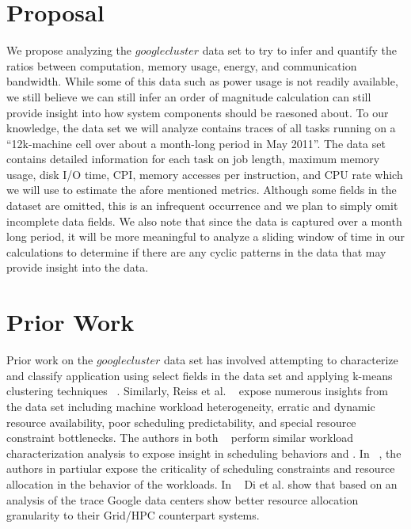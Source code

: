 \documentclass{article}
\begin{document}
\section{Proposal}

We propose analyzing the $googlecluster$ data set to try to infer and quantify the ratios between computation, memory usage, energy, and communication bandwidth. 
While some of this data such as power usage is not readily available, we still believe we can still infer an order of magnitude calculation can still provide insight into how system components should be raesoned about.
To our knowledge, the data set we will analyze contains traces of all tasks running on a ``12k-machine cell over about a month-long period in May 2011''.
The data set contains detailed information for each task on job length, maximum memory usage, disk I/O time, CPI, memory accesses per instruction, and CPU rate which we will use to estimate the afore mentioned metrics.
Although some fields in the dataset are omitted, this is an infrequent occurrence and we plan to simply omit incomplete data fields.
We also note that since the data is captured over a month long period, it will be more meaningful to analyze a sliding window of time in our calculations to determine if there are any cyclic patterns in the data that may provide insight into the data.

\section{Prior Work}

Prior work on the $googlecluster$ data set has involved attempting to characterize and classify application using select fields in the data set and applying k-means clustering techniques ~\cite{clusterdata:Di2013, clusterdata:Mishra2010}.
Similarly, Reiss et al. ~\cite{clusterdata:Reiss2012b} expose numerous insights from the data set including machine workload heterogeneity, erratic and dynamic resource availability, poor scheduling predictability, and special resource constraint bottlenecks.
The authors in both ~\cite{clusterdata:Liu2012, clusterdata:Mishra2010} perform similar workload characterization analysis to expose insight in scheduling behaviors and .
In ~\cite{clusterdata:Lui2012}, the authors in partiular expose the criticality of scheduling constraints and resource allocation in the behavior of the workloads.
In ~\cite{clusterdata:Di2012a} Di et al. show that based on an analysis of the trace Google data centers show better resource allocation granularity to their Grid/HPC counterpart systems.
\end{document}
